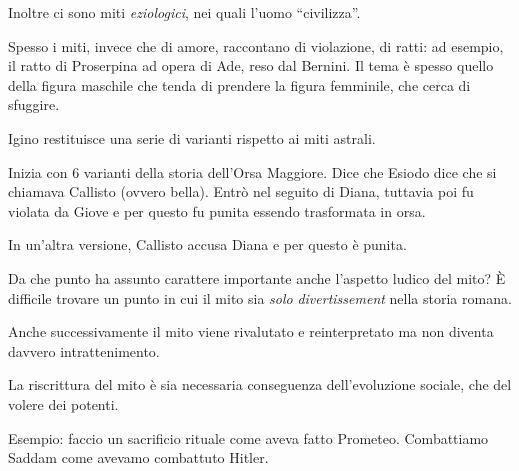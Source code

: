 \documentclass[main.tex]{subfiles}
\begin{document}
Inoltre ci sono miti \emph{eziologici}, nei quali l'uomo ``civilizza''.

Spesso i miti, invece che di amore, raccontano di violazione, di ratti: ad esempio, il ratto di Proserpina ad opera di Ade, reso dal Bernini. 
Il tema è spesso quello della figura maschile che tenda di prendere la figura femminile, che cerca di sfuggire.

Igino restituisce una serie di varianti rispetto ai miti astrali. 

Inizia con 6 varianti della storia dell'Orsa Maggiore.
Dice che Esiodo dice che si chiamava Callisto (ovvero bella).
Entrò nel seguito di Diana, tuttavia poi fu violata da Giove e per questo fu punita essendo trasformata in orsa.

In un'altra versione, Callisto accusa Diana e per questo è punita.

Da che punto ha assunto carattere importante anche l'aspetto ludico del mito?
È difficile trovare un punto in cui il mito sia \emph{solo} \emph{divertissement} nella storia romana.

Anche successivamente il mito viene rivalutato e reinterpretato ma non diventa davvero intrattenimento.

La riscrittura del mito è sia necessaria conseguenza dell'evoluzione sociale, che del volere dei potenti. 

Esempio: faccio un sacrificio rituale come aveva fatto Prometeo. 
Combattiamo Saddam come avevamo combattuto Hitler.
\end{document}
